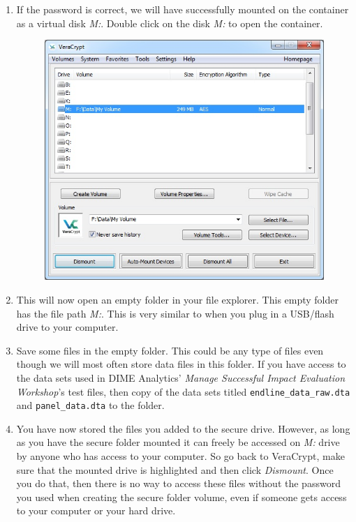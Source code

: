 \documentclass{tufte-handout}
\begin{document}
\begin{enumerate}
	\item If the password is correct, we will have successfully mounted on the container as a virtual disk \textit{M:}. Double click on the disk \textit{M:} to open the container. 
	\begin{figure}%
		\includegraphics[width=\linewidth]{img/vc_mount_6.png}
	\end{figure}
	\FloatBarrier
	
	\item This will now open an empty folder in your file explorer. This empty folder has the file path \textit{M:}. This is very similar to when you plug in a USB/flash drive to your computer. 
	
	\item Save some files in the empty folder. This could be any type of files even though we will most often store data files in this folder. If you have access to the data sets used in DIME Analytics' \textit{Manage Successful Impact Evaluation Workshop}'s test files, then copy of the data sets titled \texttt{endline\_data\_raw.dta} and \texttt{panel\_data.dta} to the folder.
	
	\item You have now stored the files you added to the secure drive. However, as long as you have the secure folder mounted it can freely be accessed on \textit{M:} drive by anyone who has access to your computer. So go back to VeraCrypt, make sure that the mounted drive is highlighted and then click \textit{Dismount}. Once you do that, then there is no way to access these files without the password you used when creating the secure folder volume, even if someone gets access to your computer or your hard drive.
	
	
\end{enumerate}
\end{document}
